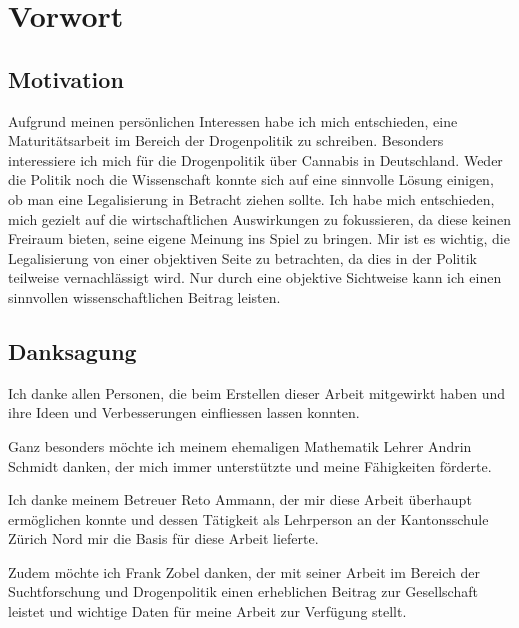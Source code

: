 \documentclass[../main.tex]{subfiles}
\begin{document}
	\section*{Vorwort}	
	
	\subsection*{Motivation}
	Aufgrund meinen persönlichen Interessen habe ich mich entschieden, eine Maturitätsarbeit im Bereich der Drogenpolitik zu schreiben. 
	Besonders interessiere ich mich für die Drogenpolitik über Cannabis in Deutschland.
	Weder die Politik noch die Wissenschaft konnte sich auf eine sinnvolle Lösung einigen, ob man eine Legalisierung in Betracht ziehen sollte.
	Ich habe mich entschieden, mich gezielt auf die wirtschaftlichen Auswirkungen zu fokussieren, da diese keinen Freiraum bieten, seine eigene Meinung ins Spiel zu bringen.
	Mir ist es wichtig, die Legalisierung von einer objektiven Seite zu betrachten, da dies in der Politik teilweise vernachlässigt wird.
	Nur durch eine objektive Sichtweise kann ich einen sinnvollen wissenschaftlichen Beitrag leisten.
	
	
	\subsection*{Danksagung}
	Ich danke allen Personen, die beim Erstellen dieser Arbeit mitgewirkt haben und ihre Ideen und Verbesserungen einfliessen lassen konnten.
	
	\noindent
	Ganz besonders möchte ich meinem ehemaligen Mathematik Lehrer Andrin Schmidt danken, der mich immer unterstützte und meine Fähigkeiten förderte.
	
	\noindent
	Ich danke meinem Betreuer Reto Ammann, der mir diese Arbeit überhaupt ermöglichen konnte und dessen Tätigkeit als Lehrperson an der Kantonsschule Zürich Nord mir die Basis für diese Arbeit lieferte.
	
	\noindent
	Zudem möchte ich Frank Zobel danken, der mit seiner Arbeit im Bereich der Suchtforschung und Drogenpolitik einen erheblichen Beitrag zur Gesellschaft leistet und wichtige Daten für meine Arbeit zur Verfügung stellt.
	
\end{document}
